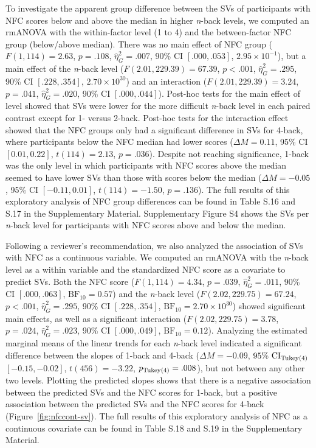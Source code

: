 \documentclass[
  man,floatsintext]{apa6}
\begin{document}
To investigate the apparent group difference between the SVs of participants with NFC scores below and above the median in higher \emph{n}-back levels, we computed an rmANOVA with the within-factor level (1 to 4) and the between-factor NFC group (below/above median).
There was no main effect of NFC group (\(F(1, 114) = 2.63\), \(p = .108\), \(\hat{\eta}^2_G = .007\), 90\% CI \([.000, .053]\), \(2.95 \times 10^{-1}\)), but a main effect of the \emph{n}-back level (\(F(2.01, 229.39) = 67.39\), \(p < .001\), \(\hat{\eta}^2_G = .295\), 90\% CI \([.228, .354]\), \(2.70 \times 10^{30}\)) and an interaction (\(F(2.01, 229.39) = 3.24\), \(p = .041\), \(\hat{\eta}^2_G = .020\), 90\% CI \([.000, .044]\)).
Post-hoc tests for the main effect of level showed that SVs were lower for the more difficult \emph{n}-back level in each paired contrast except for 1- versus 2-back.
Post-hoc tests for the interaction effect showed that the NFC groups only had a significant difference in SVs for 4-back, where participants below the NFC median had lower scores (\(\Delta M = 0.11\), 95\% CI \([0.01, 0.22]\), \(t(114) = 2.13\), \(p = .036\)).
Despite not reaching significance, 1-back was the only level in which participants with NFC scores above the median seemed to have lower SVs than those with scores below the median (\(\Delta M = -0.05\), 95\% CI \([-0.11, 0.01]\), \(t(114) = -1.50\), \(p = .136\)).
The full results of this exploratory analysis of NFC group differences can be found in Table S.16 and S.17 in the Supplementary Material.
Supplementary Figure S4 shows the SVs per \emph{n}-back level for participants with NFC scores above and below the median.

Following a reviewer's recommendation, we also analyzed the association of SVs with NFC as a continuous variable.
We computed an rmANOVA with the \emph{n}-back level as a within variable and the standardized NFC score as a covariate to predict SVs.
Both the NFC score (\(F(1, 114) = 4.34\), \(p = .039\), \(\hat{\eta}^2_G = .011\), 90\% CI \([.000, .063]\), \(\mathrm{BF}_{\textrm{10}} = 0.57\)) and the \emph{n}-back level (\(F(2.02, 229.75) = 67.24\), \(p < .001\), \(\hat{\eta}^2_G = .295\), 90\% CI \([.228, .354]\), \(\mathrm{BF}_{\textrm{10}} = 2.70 \times 10^{30}\)) showed significant main effects, as well as a significant interaction (\(F(2.02, 229.75) = 3.78\), \(p = .024\), \(\hat{\eta}^2_G = .023\), 90\% CI \([.000, .049]\), \(\mathrm{BF}_{\textrm{10}} = 0.12\)).
Analyzing the estimated marginal means of the linear trends for each \emph{n}-back level indicated a significant difference between the slopes of 1-back and 4-back (\(\Delta M = -0.09\), \(95\%\ \mathrm{CI}_\mathrm{\scriptsize Tukey(4)}\) \([-0.15, -0.02]\), \(t(456) = -3.22\), \(p_\mathrm{\scriptsize Tukey(4)} = .008\)), but not between any other two levels.
Plotting the predicted slopes shows that there is a negative association between the predicted SVs and the NFC scores for 1-back, but a positive association between the predicted SVs and the NFC scores for 4-back (Figure~\ref{fig:nfccont-sv}).
The full results of this exploratory analysis of NFC as a continuous covariate can be found in Table S.18 and S.19 in the Supplementary Material.
\end{document}
